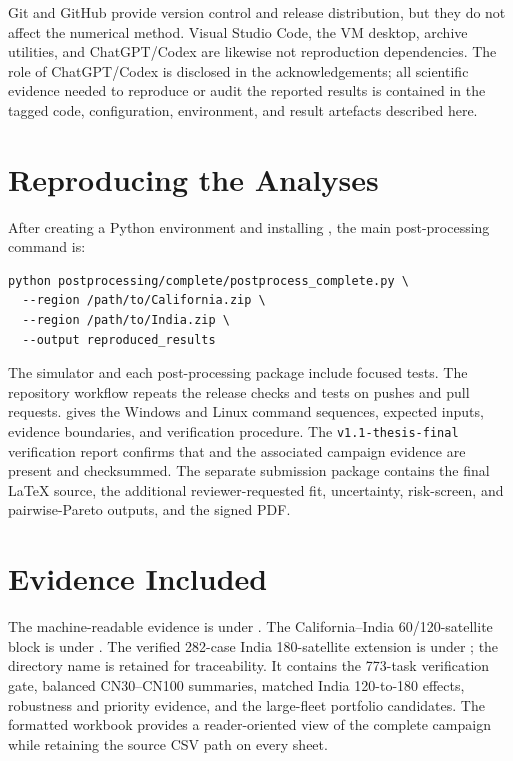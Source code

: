 Git and GitHub provide version control and release distribution, but they do not affect the numerical method. Visual Studio Code, the VM desktop, archive utilities, and ChatGPT/Codex are likewise not reproduction dependencies. The role of ChatGPT/Codex is disclosed in the acknowledgements; all scientific evidence needed to reproduce or audit the reported results is contained in the tagged code, configuration, environment, and result artefacts described here.

\section{Reproducing the Analyses}

After creating a Python environment and installing , the main post-processing command is:

\begin{lstlisting}
python postprocessing/complete/postprocess_complete.py \
  --region /path/to/California.zip \
  --region /path/to/India.zip \
  --output reproduced_results
\end{lstlisting}

The simulator and each post-processing package include focused tests. The repository workflow repeats the release checks and tests on pushes and pull requests.  gives the Windows and Linux command sequences, expected inputs, evidence boundaries, and verification procedure. The \texttt{v1.1-thesis-final} verification report confirms that  and the associated campaign evidence are present and checksummed. The separate submission package contains the final LaTeX source, the additional reviewer-requested fit, uncertainty, risk-screen, and pairwise-Pareto outputs, and the signed PDF.

\section{Evidence Included}

The machine-readable evidence is under . The California--India 60/120-satellite block is under . The verified 282-case India 180-satellite extension is under ; the directory name is retained for traceability. It contains the 773-task verification gate, balanced CN30--CN100 summaries, matched India 120-to-180 effects, robustness and priority evidence, and the large-fleet portfolio candidates. The formatted workbook  provides a reader-oriented view of the complete campaign while retaining the source CSV path on every sheet.

